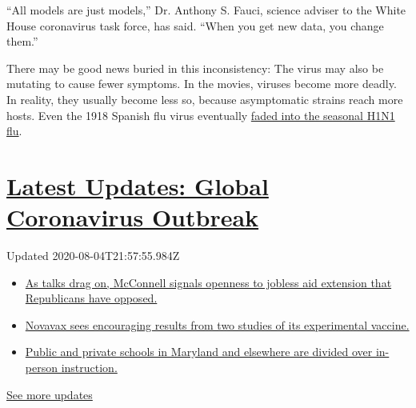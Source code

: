 ``All models are just models,'' Dr. Anthony S. Fauci, science adviser to
the White House coronavirus task force, has said. ``When you get new
data, you change them.''

There may be good news buried in this inconsistency: The virus may also
be mutating to cause fewer symptoms. In the movies, viruses become more
deadly. In reality, they usually become less so, because asymptomatic
strains reach more hosts. Even the 1918 Spanish flu virus eventually
\href{https://www.ncbi.nlm.nih.gov/pmc/articles/PMC3180813/}{faded into
the seasonal H1N1 flu}.

\hypertarget{latest-updates-global-coronavirus-outbreak}{%
\section{\texorpdfstring{\href{https://www.nytimes3xbfgragh.onion/2020/08/04/world/coronavirus-cases.html?action=click\&pgtype=Article\&state=default\&region=MAIN_CONTENT_1\&context=storylines_live_updates}{Latest
Updates: Global Coronavirus
Outbreak}}{Latest Updates: Global Coronavirus Outbreak}}\label{latest-updates-global-coronavirus-outbreak}}

Updated 2020-08-04T21:57:55.984Z

\begin{itemize}
\tightlist
\item
  \href{https://www.nytimes3xbfgragh.onion/2020/08/04/world/coronavirus-cases.html?action=click\&pgtype=Article\&state=default\&region=MAIN_CONTENT_1\&context=storylines_live_updates\#link-2daa96b5}{As
  talks drag on, McConnell signals openness to jobless aid extension
  that Republicans have opposed.}
\item
  \href{https://www.nytimes3xbfgragh.onion/2020/08/04/world/coronavirus-cases.html?action=click\&pgtype=Article\&state=default\&region=MAIN_CONTENT_1\&context=storylines_live_updates\#link-1228a480}{Novavax
  sees encouraging results from two studies of its experimental
  vaccine.}
\item
  \href{https://www.nytimes3xbfgragh.onion/2020/08/04/world/coronavirus-cases.html?action=click\&pgtype=Article\&state=default\&region=MAIN_CONTENT_1\&context=storylines_live_updates\#link-4825b93}{Public
  and private schools in Maryland and elsewhere are divided over
  in-person instruction.}
\end{itemize}

\href{https://www.nytimes3xbfgragh.onion/2020/08/04/world/coronavirus-cases.html?action=click\&pgtype=Article\&state=default\&region=MAIN_CONTENT_1\&context=storylines_live_updates}{See
more updates}


